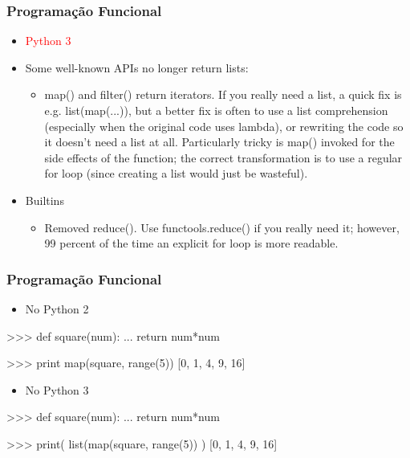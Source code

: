 \documentclass[12pt,t,graphics]{beamer}
\newcommand{\ft}[1]{\frametitle{#1}}
\newcommand{\bi}{\begin{itemize}}
\newcommand{\ei}{\end{itemize}}
\begin{document}

\begin{frame}[fragile]
  \ft{Programação Funcional}
  \vspace{-0.35cm}
  \bi
  \item \textcolor{red}{Python 3}
  \item Some well-known APIs no longer return lists:
    \bi
    \item map() and filter() return iterators. If you really need a list, a quick fix is e.g. list(map(...)), but a better fix is often to use a list comprehension (especially when the original code uses lambda), or rewriting the code so it doesn’t need a list at all. Particularly tricky is map() invoked for the side effects of the function; the correct transformation is to use a regular for loop (since creating a list would just be wasteful).
    \ei
    \item Builtins
    \bi
    \item Removed reduce(). Use functools.reduce() if you really need it; however, 99 percent of the time an explicit for loop is more readable.
    \ei
  \ei
\end{frame}


\begin{frame}[fragile]
  \ft{Programação Funcional}
  \bi
  \item No Python 2
  \ei
  \begin{python}
>>> def square(num):
...    return num*num

>>> print map(square, range(5))
[0, 1, 4, 9, 16]
  \end{python}
  \bi
  \item No Python 3
  \ei
  \begin{python}
>>> def square(num):
...    return num*num

>>> print( list(map(square, range(5)) )
[0, 1, 4, 9, 16]   
  \end{python}
\end{frame}

\end{document}
